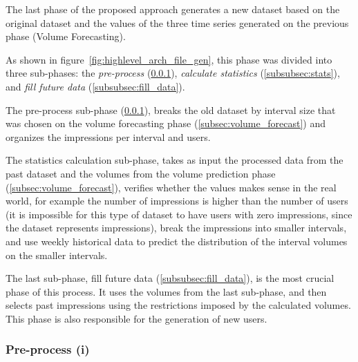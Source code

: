 The last phase of the proposed approach generates a new dataset based on the
original dataset and the values of the three time series generated on the
previous phase (Volume Forecasting).

As shown in figure~\ref{fig:highlevel_arch_file_gen}, this phase was divided
into three sub-phases: the \emph{pre-process} (\ref{subsubsec:pre_process}), \emph{calculate
statistics} (\ref{subsubsec:stats}), and \emph{fill future data}
(\ref{subsubsec:fill_data}).

The pre-process sub-phase (\ref{subsubsec:pre_process}), breaks the old dataset
by interval size that was chosen on the volume forecasting phase
(\ref{subsec:volume_forecast}) and organizes the impressions per interval and
users.

The statistics calculation sub-phase, takes as input the processed data
from the past dataset and the volumes from the volume prediction phase
(\ref{subsec:volume_forecast}), verifies whether the values makes sense in the real
world, for example the number of impressions is higher than the number of users
(it is impossible for this type of dataset to have users with zero impressions,
since the dataset represents impressions), break the impressions into smaller
intervals, and use weekly historical data to predict the distribution of the
interval volumes on the smaller intervals.

The last sub-phase, fill future data (\ref{subsubsec:fill_data}), is the most
crucial phase of this process. It uses the volumes from the last sub-phase, and
then selects past impressions using the restrictions imposed by the calculated volumes. This
phase is also responsible for the generation of new users.

\subsubsection{Pre-process (i)}\label{subsubsec:pre_process}

